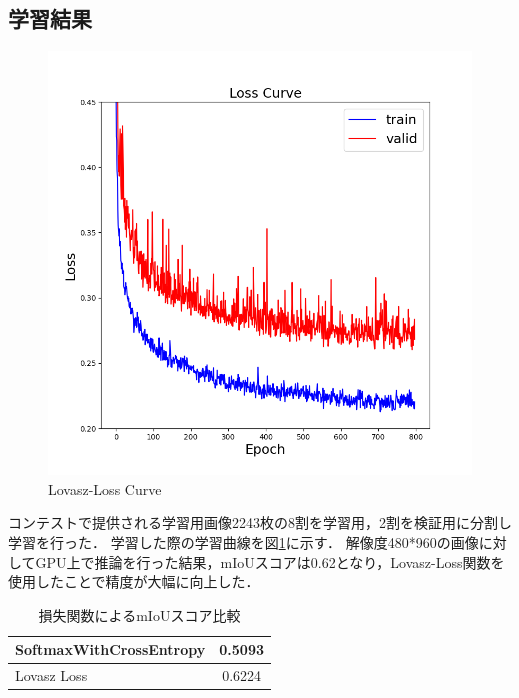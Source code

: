\subsection{学習結果}
\begin{figure}[t]
    \begin{center}
        \includegraphics[width=12.0cm]{figures/loss_curve.png}
        \caption{Lovasz-Loss Curve}
        \label{loss_curve}
        \end{center}
\end{figure}
コンテストで提供される学習用画像2243枚の8割を学習用，2割を検証用に分割し学習を行った．
学習した際の学習曲線を図\ref{loss_curve}に示す．
解像度480*960の画像に対してGPU上で推論を行った結果，mIoUスコアは0.62となり，Lovasz-Loss関数を使用したことで精度が大幅に向上した．
\begin{table}[b]
    \caption{損失関数によるmIoUスコア比較} \vspace{1mm}
    \begin{center}
        \begin{tabular}{lc}
            SoftmaxWithCrossEntropy & 0.5093                     \\ \hline
            Lovasz Loss             & 0.6224
        \end{tabular}
    \end{center}
\end{table}